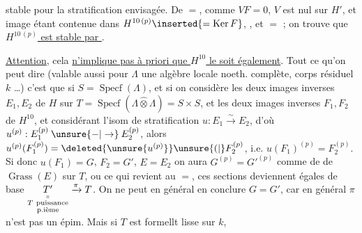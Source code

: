 stable pour la stratification envisagée. De $=$, comme $VF=0$,
$V$ est nul sur $H'$, et  image étant contenue
dans $H^{10\,(p)}\inserted{=\operatorname{Ker}F}$, ,
et $=$  ; on trouve
que \uline{$H^{10\,(p)}$ est stable par }. 

\uline{Attention}, cela \uline{n'implique pas à priori que $H^{10}$ le
soit également}. Tout ce qu'on peut dire (valable
aussi pour $\Lambda$ une algèbre locale noeth. complète,
corps résiduel $k$ \ldots) c'est que si $S=\operatorname{Specf}(\Lambda)$,
et si on considère les deux images inverses
$E_1,E_2$ de $H$ sur  $T=\operatorname{Specf}(\Lambda\widehat\otimes\Lambda)=S\times S$,
 et les deux images inverses $F_1,F_2$ de $H^{10}$,
et considérant l'isom de stratification
$u:E_1\xrightarrow{\sim}E_2$, d'où $u^{(p)}:E_1^{(p)}\mathbin{\unsure{-|\to}}E_2^{(p)}$,
alors $u^{(p)}(F_1^{(p)})=\deleted{\unsure{u^{(p)}}}\unsure{(|{}}F_2^{(p)}$, i.e.
$u(F_1)^{(p)}=F_2^{(p)}$. Si donc $u(F_1)=G$, $F_2=G'$, $E=E_2$
on aura $G^{(p)}=G'^{(p)}$ comme  de
de $\operatorname{Grass}(E)$ sur $T$, ou ce qui revient au
$=$, ces sections deviennent égales   de base
$\underset{\substack{\shortparallel\\T\ \text{puissance}\\\text{p.ième}}}{T'}\xrightarrow{\pi}T$. On ne peut en général en
conclure $G=G'$, car en général $\pi$ n'est pas un
épim. Mais si  $T$ est formellt lisse sur $k$,
